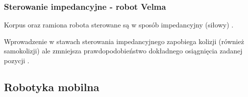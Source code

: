 
\begin{frame}
\frametitle{Sterowanie impedancyjne - robot Velma}
\begin{block}{}
Korpus oraz ramiona robota sterowane są w sposób impedancyjny (siłowy) \cite{docsVelma}.
\end{block}

\begin{block}{}
Wprowadzenie w stawach sterowania impedancyjnego zapobiega kolizji (również samokolizji) ale zmniejsza 
prawdopodobieństwo dokładnego osiągnięcia zadanej pozycji \cite{borkowska}.
\end{block}

\end{frame}



\subsection{Robotyka mobilna}



